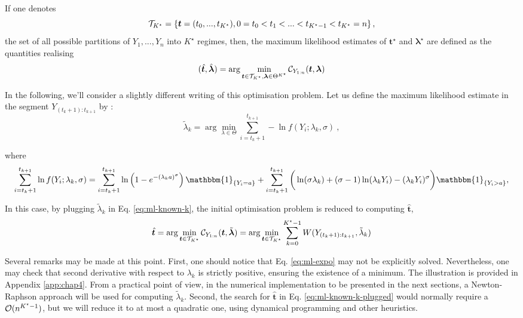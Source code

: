 If one denotes 
\begin{equation}\label{eq:vector-t}
  {\mathcal T}_{K^{\star}} = \left\{  \bm t = (t_{0}, ..., t_{K^{\star}}),  0=t_{0}<t_{1}<...<t_{K^{\star}-1}<t_{K^{\star}}=n \right\} , 
\end{equation}
the set of all possible partitions of $Y_{1}, ..., Y_{n}$ into $K^{\star}$ regimes, then, the maximum likelihood estimates of  $\bm t^{\star}$ and $\bm \lambda^{\star}$ are defined as the quantities realising
\begin{equation}\label{eq:ml-known-k}
 (\hat{\bm t}, \hat{\bm \lambda})  = \arg \min_{\bm t\in  {\mathcal T}_{K^{\star}} , \bm \lambda\in \Theta^{K^{\star}}}  {\mathcal C}_{Y_{1:n}}(\bm t, \bm \lambda ) 
\end{equation}

In the following, we'll consider a slightly different writing of this optimisation problem. Let us define the maximum likelihood estimate in the segment $Y_{(t_{k}+1) : t_{k+1}}$ by :
\begin{equation}\label{eq:ml-expo}
\tilde \lambda_{k} = \arg \min_{\lambda\in\Theta}   \sum_{i=t_{k}+1}^{t_{k+1}}-\ln f(Y_{i};\lambda_{k},\sigma) \ ,
\end{equation}

where 
\begin{equation}\label{eq:ml-wei-1}
\sum_{i=t_{k}+1}^{t_{k+1}}\ln f(Y_{i};\lambda_{k},\sigma)  = \sum_{i=t_{k}+1}^{t_{k+1}}\ln\left(1-e^{-(\lambda_{k}a)^\sigma}\right)\mathbbm{1}_{\lbrace Y_{i} = a\rbrace }+\sum_{i=t_{k}+1}^{t_{k+1}}\bigg(\ln(\sigma\lambda_{k}) + (\sigma-1)\ln(\lambda_{k}Y_i) -(\lambda_{k} Y_i)^\sigma\bigg)\mathbbm{1}_{\lbrace Y_{i} > a\rbrace}, 
\end{equation}

In this case, by plugging $\tilde \lambda_{k}$ in Eq. \ref{eq:ml-known-k}, the initial optimisation problem is reduced to computing $\hat{\bm t}$, 
\begin{equation}\label{eq:ml-known-k-plugged}
 \hat{\bm t} = \arg \min_{\bm t\in  {\mathcal T}_{K^{\star}} }  {\mathcal C}_{Y_{1:n}}(\bm t, \tilde{\bm\lambda} ) = \arg \min_{\bm t\in  {\mathcal T}_{K^{\star}} } \sum_{k=0}^{K^{\star}-1}W(Y_{(t_{k}+1) : t_{k+1}}, \tilde\lambda_{k}) 
\end{equation}

Several remarks may be made at this point. First, one should notice that Eq. \ref{eq:ml-expo} may not be explicitly solved. Nevertheless, one may check that second derivative with respect to $\lambda_{k}$ is strictly positive, ensuring the existence of a minimum. The illustration is provided in Appendix \ref{app:chap4}. From a practical point of view, in the numerical implementation to be presented in the next sections, a Newton-Raphson approach will be used for computing $\tilde \lambda_{k}$. Second, the search for $ \hat{\bm t}$ in Eq. \ref{eq:ml-known-k-plugged} would normally require a ${\mathcal O}(n^{K^{\star}-1})$, but we will reduce it to at most a quadratic one, using dynamical programming and other heuristics. 

